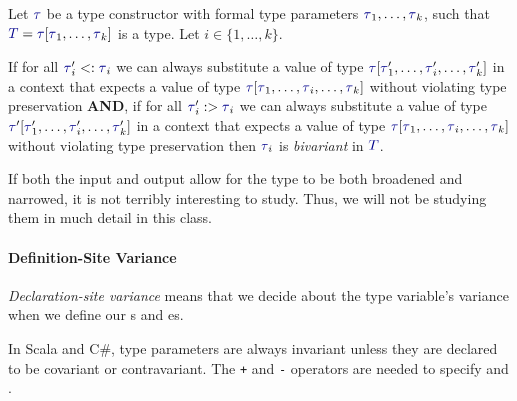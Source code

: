 \begin{definition}[Bivariance]\label{def:Type_Bivariance}
  Let $\DataType$ be a type constructor with formal type parameters $\DataType_{1}, \ldots , \DataType_{k}$, such that $\SemanticType{T} = \DataType [\DataType_{1}, \ldots, \DataType_{k}]$ is a type.
  Let $i \in \lbrace 1,\ldots, k \rbrace$.

  If for all $\DataType_{i}' <: \DataType_{i}$ we can always substitute a value of type $\DataType [\DataType_{1}',\ldots, \DataType_{i}', \ldots, \DataType_{k}']$ in a context that expects a value of type $\DataType [\DataType_{1}, \ldots, \DataType_{i}, \ldots, \DataType_{k}]$ without violating type preservation \textbf{AND}, if for all $\DataType_{i}' :> \DataType_{i}$ we can always substitute a value of type $\DataType' [\DataType_{1}', \ldots, \DataType_{i}', \ldots, \DataType_{k}']$ in a context that expects a value of type $\DataType [\DataType_{1}, \ldots, \DataType_{i}, \ldots, \DataType_{k}]$ without violating type preservation then $\DataType_{i}$ is \emph{bivariant} in $\SemanticType{T}$.

  \begin{remark}
    If both the input and output allow for the type to be both broadened and narrowed, it is not terribly interesting to study.
    Thus, we will not be studying them in much detail in this class.
  \end{remark}
\end{definition}

\paragraph{Definition-Site Variance}\label{par:Definition_Site_Variance}
\begin{definition}\label{def:Definition_Site_Variance}
  \emph{Declaration-site variance} means that we decide about the type variable's variance when we define our s and es.
\end{definition}

In Scala and C\#, type parameters are always invariant unless they are declared to be covariant or contravariant.
The \texttt{+} and \texttt{-} operators are needed to specify  and .
\inputminted[frame=lines,linenos]{scala}{./EDAP05-Concepts_Programming_Languages-Sections/Advanced_Data_Types/Code/Definition_Site_Variance.scala}

